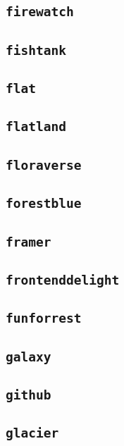 \subsection{\texttt{firewatch}}
\newpage
\subsection{\texttt{fishtank}}
\newpage
\subsection{\texttt{flat}}
\newpage
\subsection{\texttt{flatland}}
\newpage
\subsection{\texttt{floraverse}}
\newpage
\subsection{\texttt{forestblue}}
\newpage
\subsection{\texttt{framer}}
\newpage
\subsection{\texttt{frontenddelight}}
\newpage
\subsection{\texttt{funforrest}}
\newpage
\subsection{\texttt{galaxy}}
\newpage
\subsection{\texttt{github}}
\newpage
\subsection{\texttt{glacier}}
\newpage
